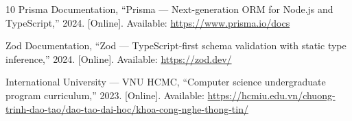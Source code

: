 \documentclass{iu-thesis}
\begin{document}
\begin{thebibliography}{10}
 Prisma Documentation, ``Prisma --- Next-generation ORM for Node.js and TypeScript,'' 2024. [Online]. Available: \url{https://www.prisma.io/docs}

 Zod Documentation, ``Zod --- TypeScript-first schema validation with static type inference,'' 2024. [Online]. Available: \url{https://zod.dev/}

 International University --- VNU HCMC, ``Computer science undergraduate program curriculum,'' 2023. [Online]. Available: \url{https://hcmiu.edu.vn/chuong-trinh-dao-tao/dao-tao-dai-hoc/khoa-cong-nghe-thong-tin/}

\end{thebibliography}

\appendix


\end{document}
